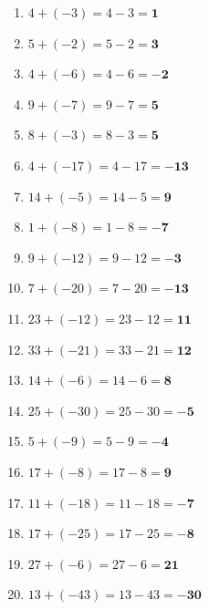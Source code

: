 \documentclass[a4paper,12pt]{article} %
\begin{document}
\begin{enumerate}

  \item \(4 + (-3) = 4 - 3 = \mathbf{1}\) %

  \item \(5 + (-2) = 5 - 2 = \mathbf{3}\) %

  \item \(4 + (-6) = 4 - 6 = \mathbf{-2}\) %

  \item \(9 + (-7) = 9 - 7 = \mathbf{5}\) %

  \item \(8 + (-3) = 8 - 3 = \mathbf{5}\) %

  \item \(4 + (-17) = 4 - 17 = \mathbf{-13}\) %

  \item \(14 + (-5) = 14 - 5 = \mathbf{9}\) %

  \item \(1 + (-8) = 1 - 8 = \mathbf{-7}\) %

  \item \(9 + (-12) = 9 - 12 = \mathbf{-3}\) %

  \item \(7 + (-20) = 7 - 20 = \mathbf{-13}\) %

  \item \(23 + (-12) = 23 - 12 = \mathbf{11}\) %

  \item \(33 + (-21) = 33 - 21 = \mathbf{12}\) %

  \item \(14 + (-6) = 14 - 6 = \mathbf{8}\) %

  \item \(25 + (-30) = 25 - 30 = \mathbf{-5}\) %

  \item \(5 + (-9) = 5 - 9 = \mathbf{-4}\) %

  \item \(17 + (-8) = 17 - 8 = \mathbf{9}\) %

  \item \(11 + (-18) = 11 - 18 = \mathbf{-7}\) %

  \item \(17 + (-25) = 17 - 25 = \mathbf{-8}\) %

  \item \(27 + (-6) = 27 - 6 = \mathbf{21}\) %

  \item \(13 + (-43) = 13 - 43 = \mathbf{-30}\) %


\end{enumerate}
\end{document}
